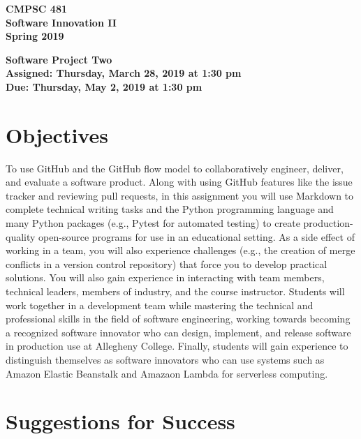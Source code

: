 \documentclass[11pt]{article}
\newcommand{\assignmentduedate}{May 2}
\newcommand{\assignmentassignedate}{March 28}
\newcommand{\assignmentnumber}{Two}
\newcommand{\labyear}{2019}
\newcommand{\labdueday}{Thursday}
\newcommand{\labassignday}{Thursday}
\newcommand{\labtime}{1:30 pm}
\newcommand{\assigneddate}{Assigned: \labassignday, \assignmentassignedate, \labyear{} at \labtime{}}
\newcommand{\duedate}{Due: \labdueday, \assignmentduedate, \labyear{} at \labtime{}}
\newcommand{\labtitle}[1]
{
  \begin{center}
    \begin{center}
      \bf
      CMPSC 481\\Software Innovation II\\
      Spring 2019\\
      \medskip
    \end{center}
    \bf
    #1
  \end{center}
}
\begin{document}
\thispagestyle{empty}

\labtitle{Software Project \assignmentnumber{} \\ \assigneddate{} \\ \duedate{}}

\section*{Objectives}

To use GitHub and the GitHub flow model to collaboratively engineer, deliver,
and evaluate a software product.
%
Along with using GitHub features like the issue tracker and reviewing pull
requests, in this assignment you will use Markdown to complete technical writing
tasks and the Python programming language and many Python packages (e.g., Pytest
for automated testing) to create production-quality open-source programs for use
in an educational setting.
%
As a side effect of working in a team, you will also experience challenges
(e.g., the creation of merge conflicts in a version control repository) that
force you to develop practical solutions.
%
You will also gain experience in interacting with team members, technical
leaders, members of industry, and the course instructor.
%
Students will work together in a development team while mastering the technical
and professional skills in the field of software engineering, working towards
becoming a recognized software innovator who can design, implement, and release
software in production use at Allegheny College.
%
Finally, students will gain experience to distinguish themselves as software
innovators who can use systems such as Amazon Elastic Beanstalk and Amazaon
Lambda for serverless computing.

\section*{Suggestions for Success}
\end{document}
